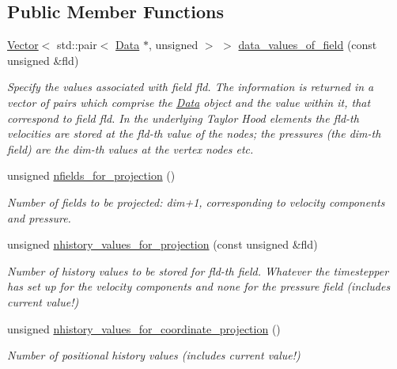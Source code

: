 \subsection*{Public Member Functions}
\begin{DoxyCompactItemize}
\item 
\hyperlink{classoomph_1_1Vector}{Vector}$<$ std\+::pair$<$ \hyperlink{classoomph_1_1Data}{Data} $\ast$, unsigned $>$ $>$ \hyperlink{classoomph_1_1ProjectableAxisymmetricTaylorHoodElement_a9008d18dbbbcfa54964766fbe2d31cde}{data\+\_\+values\+\_\+of\+\_\+field} (const unsigned \&fld)
\begin{DoxyCompactList}\small\item\em Specify the values associated with field fld. The information is returned in a vector of pairs which comprise the \hyperlink{classoomph_1_1Data}{Data} object and the value within it, that correspond to field fld. In the underlying Taylor Hood elements the fld-\/th velocities are stored at the fld-\/th value of the nodes; the pressures (the dim-\/th field) are the dim-\/th values at the vertex nodes etc. \end{DoxyCompactList}\item 
unsigned \hyperlink{classoomph_1_1ProjectableAxisymmetricTaylorHoodElement_a60842beb2f919f071623db9c1dc8a69a}{nfields\+\_\+for\+\_\+projection} ()
\begin{DoxyCompactList}\small\item\em Number of fields to be projected\+: dim+1, corresponding to velocity components and pressure. \end{DoxyCompactList}\item 
unsigned \hyperlink{classoomph_1_1ProjectableAxisymmetricTaylorHoodElement_af37df6381430a8983892ff3a1b425266}{nhistory\+\_\+values\+\_\+for\+\_\+projection} (const unsigned \&fld)
\begin{DoxyCompactList}\small\item\em Number of history values to be stored for fld-\/th field. Whatever the timestepper has set up for the velocity components and none for the pressure field (includes current value!) \end{DoxyCompactList}\item 
unsigned \hyperlink{classoomph_1_1ProjectableAxisymmetricTaylorHoodElement_a88869af2e716697b7d9296c9de2af9bf}{nhistory\+\_\+values\+\_\+for\+\_\+coordinate\+\_\+projection} ()
\begin{DoxyCompactList}\small\item\em Number of positional history values (includes current value!) \end{DoxyCompactList}\item 

\end{DoxyCompactItemize}
